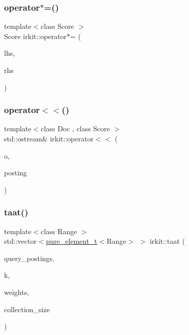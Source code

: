 \subsubsection{\texorpdfstring{operator$\ast$=()}{operator*=()}}
{\footnotesize\ttfamily template$<$class Score $>$ \\
Score irkit\+::operator$\ast$= (\begin{DoxyParamCaption}\item[{Score \&}]{lhs,  }\item[{const \hyperlink{structirkit_1_1IdWeight}{Id\+Weight} \&}]{rhs }\end{DoxyParamCaption})}

\mbox{\label{namespaceirkit_ad1396887d32809df7506bb0f4b3c24ef}} 
\subsubsection{\texorpdfstring{operator$<$$<$()}{operator<<()}}
{\footnotesize\ttfamily template$<$class Doc , class Score $>$ \\
std\+::ostream\& irkit\+::operator$<$$<$ (\begin{DoxyParamCaption}\item[{std\+::ostream \&}]{o,  }\item[{\hyperlink{structirkit_1_1__Posting}{\+\_\+\+Posting}$<$ Doc, Score $>$}]{posting }\end{DoxyParamCaption})}

\mbox{\label{namespaceirkit_a2920c3041cd301d3dbe9d27178711ff8}} 
\subsubsection{\texorpdfstring{taat()}{taat()}}
{\footnotesize\ttfamily template$<$class Range $>$ \\
std\+::vector$<$\hyperlink{namespaceirkit_afcffab67300c5c703cb38a363c9a6f1d}{pure\+\_\+element\+\_\+t}$<$Range$>$ $>$ irkit\+::taat (\begin{DoxyParamCaption}\item[{const std\+::vector$<$ Range $>$ \&}]{query\+\_\+postings,  }\item[{std\+::size\+\_\+t}]{k,  }\item[{const std\+::vector$<$ \hyperlink{namespaceirkit_a754dabe3346f950c948e7596d9d46c71}{score\+\_\+t}$<$ \hyperlink{namespaceirkit_afcffab67300c5c703cb38a363c9a6f1d}{pure\+\_\+element\+\_\+t}$<$ Range $>$$>$$>$ \&}]{weights,  }\item[{std\+::size\+\_\+t}]{collection\+\_\+size }\end{DoxyParamCaption})}

